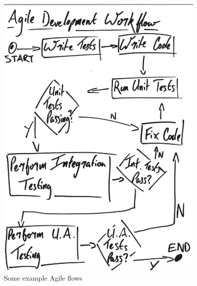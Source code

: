 \begin{figure}[p]
    \centering
    \includegraphics[width=0.9\textwidth]{images/Example_agile_flows.pdf}
    \caption{Some example Agile flows}
    \label{fig:example_flows}
\end{figure}

